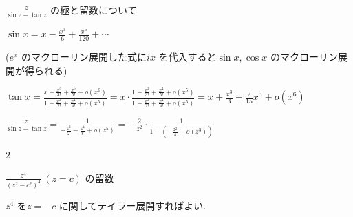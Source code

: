 \documentclass[10pt]{jsarticle}
\begin{document}
$\displaystyle \frac{z}{\sin z - \tan z}$ の極と留数について

$\sin x = x - \displaystyle \frac{x^3}{6} + \displaystyle \frac{x^5}{120} + \cdots$

($e^x$ のマクローリン展開した式に$ix$ を代入すると$\sin x, \cos x$ のマクローリン展開が得られる)

$\tan x 
= \displaystyle \frac{x-\frac{x^3}{3!} + \frac{x^5}{5!} + o(x^6)}{1 - \frac{x^2}{2!} + \frac{x^4}{4!} + o(x^5)}
= x \cdot \displaystyle \frac{1- \frac{x^2}{3!} + \frac{x^4}{5!} + o(x^5)}{1 - \frac{x^2}{2!} + \frac{x^4}{4!} + o(x^5)}
= x + \displaystyle \frac{x^3}{3} + \displaystyle \frac{2}{15}x^5 + o(x^6)$

$\displaystyle \frac{z}{\sin z - \tan z}
= \displaystyle \frac{1}{-\frac{z^2}{2} - \frac{z^4}{8} + o(z^5)}
= -\frac{2}{z^2} \cdot \frac{1}{1-(-\frac{z^2}{4} - o(z^3))}$

\textcircled{\scriptsize 2}

$\displaystyle \frac{z^4}{(z^2 - c^2)^4} \ (z = c)$ の留数

$z^4$ を$z = -c$ に関してテイラー展開すればよい.
\end{document}
